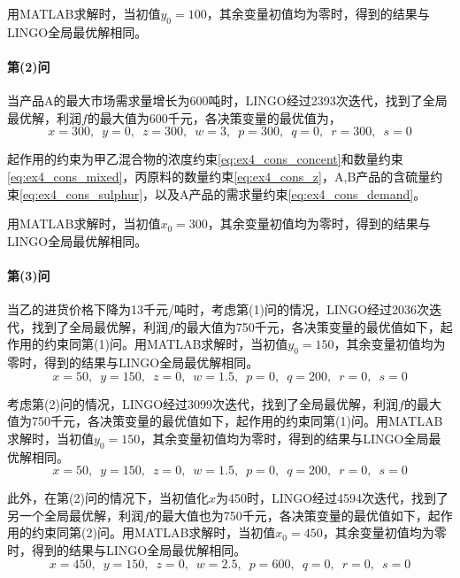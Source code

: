 \documentclass[12pt,a4paper]{article}
\begin{document}
用MATLAB求解时，当初值$y_0=100$，其余变量初值均为零时，得到的结果与LINGO全局最优解相同。

\paragraph{第(2)问} 当产品A的最大市场需求量增长为600吨时，LINGO经过2393次迭代，找到了全局最优解，利润$f$的最大值为600千元，各决策变量的最优值为，
\begin{equation}
    x=300, \enspace y=0, \enspace z=300, \enspace w=3, \enspace p=300, \enspace q=0, \enspace r=300,\enspace s=0
\end{equation}

起作用的约束为甲乙混合物的浓度约束\ref{eq:ex4_cons_concent}和数量约束\ref{eq:ex4_cons_mixed}，丙原料的数量约束\ref{eq:ex4_cons_z}，A,B产品的含硫量约束\ref{eq:ex4_cons_sulphur}，以及A产品的需求量约束\ref{eq:ex4_cons_demand}。

用MATLAB求解时，当初值$x_0=300$，其余变量初值均为零时，得到的结果与LINGO全局最优解相同。

\paragraph{第(3)问} 当乙的进货价格下降为13千元/吨时，考虑第(1)问的情况，LINGO经过2036次迭代，找到了全局最优解，利润$f$的最大值为750千元，各决策变量的最优值如下，起作用的约束同第(1)问。用MATLAB求解时，当初值$y_0=150$，其余变量初值均为零时，得到的结果与LINGO全局最优解相同。
\begin{equation}
    x=50, \enspace y=150, \enspace z=0, \enspace w=1.5, \enspace p=0, \enspace q=200, \enspace r=0,\enspace s=0
\end{equation}

考虑第(2)问的情况，LINGO经过3099次迭代，找到了全局最优解，利润$f$的最大值为750千元，各决策变量的最优值如下，起作用的约束同第(1)问。用MATLAB求解时，当初值$y_0=150$，其余变量初值均为零时，得到的结果与LINGO全局最优解相同。
\begin{equation}
    x=50, \enspace y=150, \enspace z=0, \enspace w=1.5, \enspace p=0, \enspace q=200, \enspace r=0, \enspace s=0
\end{equation}

此外，在第(2)问的情况下，当初值化$x$为450时，LINGO经过4594次迭代，找到了另一个全局最优解，利润$f$的最大值也为750千元，各决策变量的最优值如下，起作用的约束同第(2)问。用MATLAB求解时，当初值$x_0=450$，其余变量初值均为零时，得到的结果与LINGO全局最优解相同。
\begin{equation}
    x=450, \enspace y=150, \enspace z=0, \enspace w=2.5, \enspace p=600, \enspace q=0, \enspace r=0, \enspace s=0
\end{equation}
\end{document}
